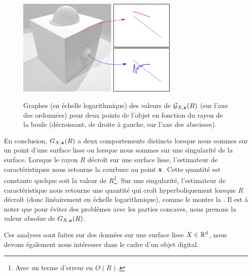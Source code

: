 \begin{figure}[ht]
\begin{center}
  {\includegraphics[width=8cm]{figures/CubeSpherePlot_ES_NoColor}}
  \caption{Graphes (en échelle logarithmique) des valeurs de $\mathcal{G}_{X,\mathbf{x}}(R)$ (sur
  l'axe des ordonnées) pour deux points de l'objet
  \CubeSphere en fonction du rayon de la boule (décroissant, de droite à gauche,
  sur l'axe des abscisses).\label{fig:CubeSpherePlot_ES_NoColor}}
\end{center}
\end{figure}
%
En conclusion, $G_{X,\mathbf{x}}(R)$ a deux comportements distincts lorsque nous sommes
sur un point d'une surface lisse ou lorsque nous sommes sur une singularité de
la surface. Lorsque le rayon $R$ décroît sur une surface lisse, l'estimateur de
caractéristiques nous retourne la courbure au point $\mathbf{x}$. Cette quantité est
constante quelque soit la valeur de $R$\footnote{Avec un terme d'erreur en $O(R)$.}. Sur une singularité, l'estimateur de caractéristique
nous retourne une quantité qui croît hyperboliquement lorsque $R$ décroît (donc
linéairement en échelle logarithmique), comme le montre la
. Il est à noter que pour éviter des
problèmes avec les parties concaves, nous prenons la valeur absolue de
$G_{X,\mathbf{x}}(R)$.


Ces analyses sont faites sur des données sur une surface lisse $X \in
\mathbb{R}^d$, nous devons également nous intéresser dans le cadre d'un objet digital.
%
